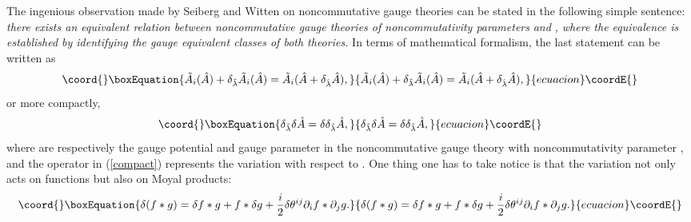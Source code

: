\documentclass[a4paper,a4paper]{article}%
\begin{document}
The ingenious observation made by Seiberg and Witten on noncommutative gauge
theories can be stated in the following simple sentence: \emph{there exists an
equivalent relation between noncommutative gauge theories of noncommutativity
parameters }\myHighlight{$\theta$}\coordHE{} \emph{and }\myHighlight{$\theta+\delta\theta$}\coordHE{}\emph{, where the
equivalence is established by identifying the gauge equivalent classes of both
theories. }In terms of mathematical formalism, the last statement can be
written as%
\begin{equation}\coord{}\boxEquation{
\tilde{A}_{i}(\hat{A})+\delta_{\tilde{\lambda}}\tilde{A}_{i}
(\hat{A})=\tilde{A}_{i}(\hat{A}+\delta_{\hat{\lambda}}\hat{A}), \label{SW}
}{
\tilde{A}_{i}(\hat{A})+\delta_{\tilde{\lambda}}\tilde{A}_{i}
(\hat{A})=\tilde{A}_{i}(\hat{A}+\delta_{\hat{\lambda}}\hat{A}), }{ecuacion}\coordE{}\end{equation}
or more compactly,%
\begin{equation}\coord{}\boxEquation{
\delta_{\tilde{\lambda}}\delta\hat{A}=\delta\delta_{\tilde{\lambda}}\hat{A},
\label{compact}
}{
\delta_{\tilde{\lambda}}\delta\hat{A}=\delta\delta_{\tilde{\lambda}}\hat{A},
}{ecuacion}\coordE{}\end{equation}
where \coordHE{} are respectively the gauge potential and
gauge parameter in the noncommutative gauge theory with noncommutativity
parameter \myHighlight{$\theta+\delta\theta$}\coordHE{}, and the operator \myHighlight{$\delta$}\coordHE{} in (\ref{compact})
represents the variation with respect to \myHighlight{$\theta$}\coordHE{}. One thing one has to take
notice is that the variation \myHighlight{$\delta$}\coordHE{} not only acts on functions but also on
Moyal products:%
\begin{equation}\coord{}\boxEquation{
\delta(f\ast g)=\delta f\ast g+f\ast\delta g+\frac{i}{2}\delta\theta
^{ij}\partial_{i}f\ast\partial_{j}g. \label{var}
}{
\delta(f\ast g)=\delta f\ast g+f\ast\delta g+\frac{i}{2}\delta\theta
^{ij}\partial_{i}f\ast\partial_{j}g. }{ecuacion}\coordE{}\end{equation}
\end{document}
